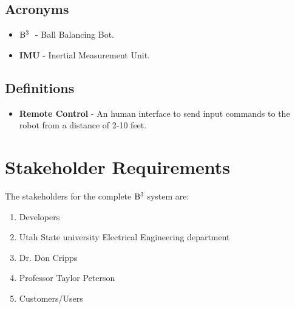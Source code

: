 \documentclass[12pt,a4paper]{article}
\newcommand{\BBB}{${\rm B}^3\;$}
\begin{document}
\begin{flushleft}
		\subsection{Acronyms}
		\begin{itemize}
			\item \textbf{\BBB} - Ball Balancing Bot.
			\item \textbf{IMU} - Inertial Measurement Unit.
		\end{itemize}
		\subsection{Definitions}
		\begin{itemize}
			\item \textbf{Remote Control} - An human interface to send input commands to the robot from a distance of 2-10 feet.
		\end{itemize}
		
		
		\pagebreak
		\section{Stakeholder Requirements}
		The stakeholders for the complete \BBB system are:
		\begin{enumerate}
			\item Developers
			\item Utah State university Electrical Engineering department
			\item Dr. Don Cripps
			\item Professor Taylor Peterson
			\item Customers/Users
		\end{enumerate}
		

\end{flushleft}
\end{document}
